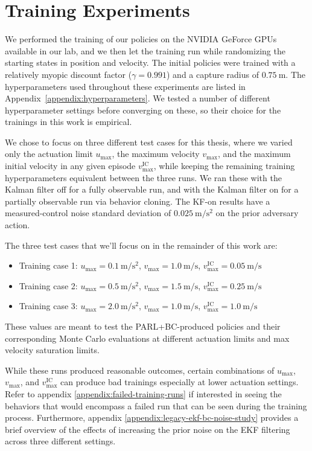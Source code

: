 \chapter{Training Experiments}


We performed the training of our policies on the NVIDIA GeForce GPUs available in our lab, and we then let the training run while randomizing the starting states in position and velocity. The initial policies were trained with a relatively myopic discount factor ($\gamma = 0.991$) and a capture radius of $0.75~\mathrm{m}$. The hyperparameters used throughout these experiments are listed in Appendix~\ref{appendix:hyperparameters}. We tested a number of different hyperparameter settings before converging on these, so their choice for the trainings in this work is empirical.


We chose to focus on three different test cases for this thesis, where we varied only the actuation limit $u_{\max}$, the maximum velocity $v_{\max}$, and the maximum initial velocity in any given episode $v_{\max}^{\mathrm{IC}}$, while keeping the remaining training hyperparameters equivalent between the three runs. We ran these with the Kalman filter off for a fully observable run, and with the Kalman filter on for a partially observable run via behavior cloning. The KF-on results have a measured-control noise standard deviation of $0.025~\mathrm{m/s^2}$ on the prior adversary action.

The three test cases that we'll focus on in the remainder of this work are:


\begin{itemize}
    \item Training case 1: $u_{\max} = 0.1~\mathrm{m/s^2}$, $v_{\max} = 1.0~\mathrm{m/s}$, $v_{\max}^{\mathrm{IC}} = 0.05~\mathrm{m/s}$
    \item Training case 2: $u_{\max} = 0.5~\mathrm{m/s^2}$, $v_{\max} = 1.5~\mathrm{m/s}$, $v_{\max}^{\mathrm{IC}} = 0.25~\mathrm{m/s}$
    \item Training case 3: $u_{\max} = 2.0~\mathrm{m/s^2}$, $v_{\max} = 1.0~\mathrm{m/s}$, $v_{\max}^{\mathrm{IC}} = 1.0~\mathrm{m/s}$
\end{itemize}

These values are meant to test the PARL+BC-produced policies and their corresponding Monte Carlo evaluations at different actuation limits and max velocity saturation limits. 

While these runs produced reasonable outcomes, certain combinations of $u_{\max}$, $v_{\max}$, and $v_{\max}^{\mathrm{IC}}$ can produce bad trainings especially at lower actuation settings. Refer to appendix \ref{appendix:failed-training-runs} if interested in seeing the behaviors that would encompass a failed run that can be seen during the training process. Furthermore, appendix \ref{appendix:legacy-ekf-bc-noise-study} provides a brief overview of the effects of increasing the prior noise on the EKF filtering across three different settings.


